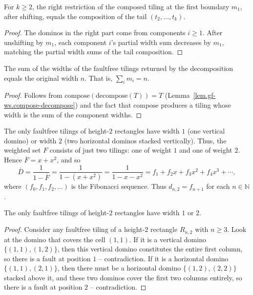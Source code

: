 \begin{lemma}
\label{lem.gf-ws.restrict-right-compose-eq}
\leanhelper
\leanok
For $k \ge 2$, the right restriction of the composed tiling at the first
boundary $m_1$, after shifting, equals the composition of the tail
$(t_2, \ldots, t_k)$.
\end{lemma}

\begin{proof}
\leanok
The dominos in the right part come from components $i \ge 1$. After
unshifting by $m_1$, each component $i$'s partial width sum decreases by
$m_1$, matching the partial width sums of the tail composition.
\end{proof}

\begin{lemma}
\label{lem.gf-ws.decompose-weight-sum}
\leanhelper
\leanok
The sum of the widths of the faultfree tilings returned by the
decomposition equals the original width $n$. That is,
$\sum_{i} m_i = n$.
\end{lemma}

\begin{proof}
\leanok
Follows from $\mathrm{compose}(\mathrm{decompose}(T)) = T$ (Lemma~\ref{lem.gf-ws.compose-decompose})
and the fact that $\mathrm{compose}$ produces a tiling whose width is the
sum of the component widths.
\end{proof}

The only faultfree tilings of height-$2$ rectangles have width $1$
(one vertical domino) or width $2$ (two horizontal dominos stacked
vertically). Thus, the weighted set $F$ consists of just two tilings: one
of weight $1$ and one of weight $2$. Hence $\overline{F}=x+x^{2}$, and so
\[
\overline{D}=\dfrac{1}{1-\overline{F}}=\dfrac{1}{1-\left(  x+x^{2}\right)
}=\dfrac{1}{1-x-x^{2}}=f_{1}+f_{2}x+f_{3}x^{2}+f_{4}x^{3}+\cdots,
\]
where $\left(  f_{0},f_{1},f_{2},\ldots\right)  $ is the Fibonacci sequence.
Thus $d_{n,2}=f_{n+1}$ for each $n\in\mathbb{N}$.

\begin{lemma}
\label{lem.gf-ws.faultfree-height2-classification}
\leanhelper
\leanok
The only faultfree tilings of height-$2$ rectangles have width $1$ or $2$.
\end{lemma}

\begin{proof}
\leanok
Consider any faultfree tiling of a height-$2$ rectangle $R_{n,2}$ with $n \geq 3$.
Look at the domino that covers the cell $(1,1)$. If it is a vertical domino
$\{(1,1),(1,2)\}$, then this vertical domino constitutes the entire first
column, so there is a fault at position $1$ -- contradiction. If it is a
horizontal domino $\{(1,1),(2,1)\}$, then there must be a horizontal domino
$\{(1,2),(2,2)\}$ stacked above it, and these two dominos cover the first two
columns entirely, so there is a fault at position $2$ -- contradiction.
\end{proof}

